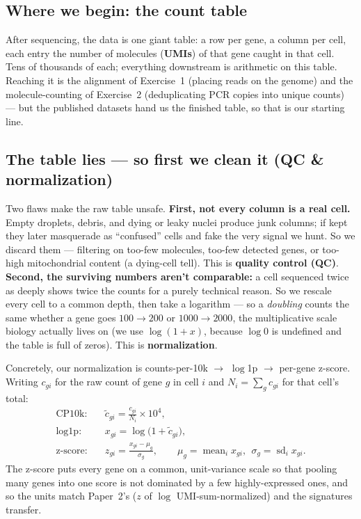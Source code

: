\documentclass[11pt]{article}
\begin{document}
\subsection{Where we begin: the count table}

After sequencing, the data is one giant table: a row per gene, a column per cell, each entry the number
of molecules (\textbf{UMIs}) of that gene caught in that cell. Tens of thousands of each; everything
downstream is arithmetic on this table. Reaching it is the alignment of Exercise~1 (placing reads on
the genome) and the molecule-counting of Exercise~2 (deduplicating PCR copies into unique counts) ---
but the published datasets hand us the finished table, so that is our starting line.

\subsection{The table lies --- so first we clean it (QC \& normalization)}

Two flaws make the raw table unsafe. \textbf{First, not every column is a real cell.} Empty droplets,
debris, and dying or leaky nuclei produce junk columns; if kept they later masquerade as ``confused''
cells and fake the very signal we hunt. So we discard them --- filtering on too-few molecules, too-few
detected genes, or too-high mitochondrial content (a dying-cell tell). This is \textbf{quality control
(QC)}. \textbf{Second, the surviving numbers aren't comparable:} a cell sequenced twice as deeply shows
twice the counts for a purely technical reason. So we rescale every cell to a common depth, then take a
logarithm --- so a \emph{doubling} counts the same whether a gene goes $100\to200$ or $1000\to2000$,
the multiplicative scale biology actually lives on (we use $\log(1+x)$, because $\log 0$ is undefined
and the table is full of zeros). This is \textbf{normalization}.

Concretely, our normalization is counts-per-10k $\to$ $\log$1p $\to$ per-gene z-score. Writing
$c_{gi}$ for the raw count of gene $g$ in cell $i$ and $N_i=\sum_g c_{gi}$ for that cell's total:
\begin{align}
\text{CP10k:}\quad & \tilde c_{gi} = \frac{c_{gi}}{N_i}\times 10^4, \\
\text{log1p:}\quad & x_{gi} = \log\!\big(1+\tilde c_{gi}\big), \\
\text{z-score:}\quad & z_{gi} = \frac{x_{gi}-\mu_g}{\sigma_g},
\qquad \mu_g=\operatorname{mean}_i x_{gi},\ \ \sigma_g=\operatorname{sd}_i x_{gi}.
\end{align}
The z-score puts every gene on a common, unit-variance scale so that pooling many genes into one score
is not dominated by a few highly-expressed ones, and so the units match Paper~2's
($z$ of $\log$ UMI-sum-normalized) and the signatures transfer.
\end{document}
